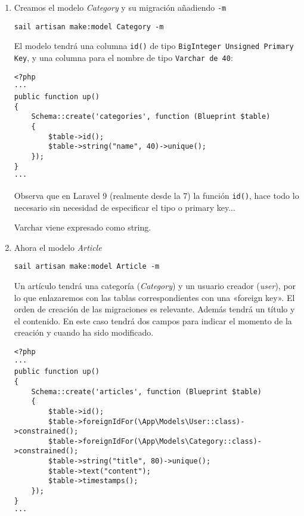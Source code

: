 \documentclass[11pt]{article}
\begin{document}
\begin{enumerate}
\item Creamos el modelo \emph{Category} y su migración añadiendo \texttt{-m}
\label{sec:org41aa717}
\begin{verbatim}
sail artisan make:model Category -m
\end{verbatim}


El modelo tendrá una columna \texttt{id()} de tipo \texttt{BigInteger Unsigned
Primary Key}, y una columna para el nombre de tipo \texttt{Varchar de 40}:
\begin{verbatim}
<?php
···
public function up()
{
    Schema::create('categories', function (Blueprint $table)
    {
        $table->id();
        $table->string("name", 40)->unique();
    });
}
···
\end{verbatim}

Observa que en Laravel 9 (realmente desde la 7) la función \texttt{id()},
hace todo lo necesario sin necesidad de especificar el tipo o primary
key...

Varchar viene expresado como string.

\item Ahora el modelo \emph{Article}
\label{sec:org8303fb7}
\begin{verbatim}
sail artisan make:model Article -m
\end{verbatim}

Un artículo tendrá una categoría (\emph{Category}) y un usuario creador
(\emph{user}), por lo que enlazaremos con las tablas correspondientes con
una «foreign key». El orden de creación de las migraciones es
relevante. Además tendrá un título y el contenido. En este caso tendrá
dos campos para indicar el momento de la creación y cuando ha sido
modificado.

\begin{verbatim}
<?php
···
public function up()
{
    Schema::create('articles', function (Blueprint $table)
    {
        $table->id();
        $table->foreignIdFor(\App\Models\User::class)->constrained();
        $table->foreignIdFor(\App\Models\Category::class)->constrained();
        $table->string("title", 80)->unique();
        $table->text("content");
        $table->timestamps();
    });
}
···
\end{verbatim}
\end{enumerate}
\end{document}
